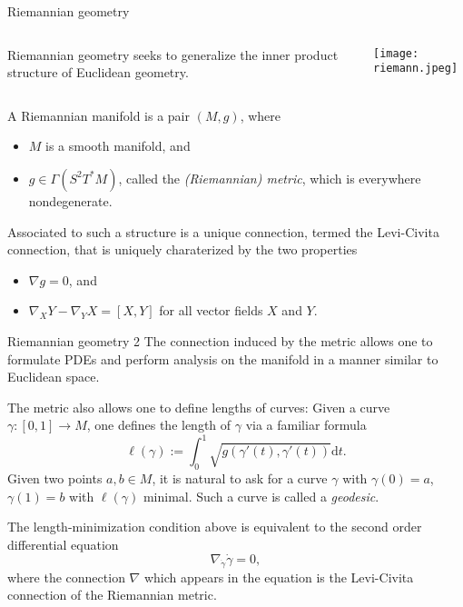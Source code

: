 \documentclass[handout]{beamer}
\begin{document}
\begin{frame}{Riemannian geometry}
  \begin{columns}
    \begin{column}{0.7 \textwidth}
      Riemannian geometry seeks to generalize the inner product structure of Euclidean geometry.
    \end{column}
    \begin{column}{0.3 \textwidth}
      \begin{center}
        \texttt{[image: riemann.jpeg]}
      \end{center}
    \end{column}
  \end{columns}
    \begin{definition}
      A Riemannian manifold is a pair $(M,g)$, where 
      \begin{itemize}
        \item $M$ is a smooth manifold, and 
        \item $g\in \Gamma(S^2 T^* M)$, called the \emph{(Riemannian) metric}, which is everywhere nondegenerate.
      \end{itemize}
    \end{definition}
  Associated to such a structure is a unique connection, termed the Levi-Civita connection, that is uniquely charaterized by the two properties
  \begin{itemize}
    \item $\nabla g = 0$, and 
    \item $\nabla_X Y - \nabla_Y X = [X,Y]$ for all vector fields $X$ and $Y$.
  \end{itemize}
\end{frame}

\begin{frame}{Riemannian geometry 2}
  The connection induced by the metric allows one to formulate PDEs and perform analysis on the manifold in a manner similar to Euclidean space.

  The metric also allows one to define lengths of curves:
  Given a curve $\gamma : [0,1] \to M$, one defines the length of $\gamma$ via a familiar formula 
  \[
    \ell(\gamma) := \int_0 ^1 \sqrt{g(\gamma'(t), \gamma'(t))} \mathrm{d} t.
  \]
  Given two points $a,b \in M$, it is natural to ask for a curve $\gamma$ with $\gamma(0)=a$, $\gamma(1)=b$ with $\ell(\gamma)$ minimal.
  Such a curve is called a \emph{geodesic}.

  The length-minimization condition above is equivalent to the second order differential equation 
  \[
    \nabla_{\dot{\gamma}} \dot{\gamma} = 0,
  \]
  where the connection $\nabla$ which appears in the equation is the Levi-Civita connection of the Riemannian metric.
\end{frame}
\end{document}
